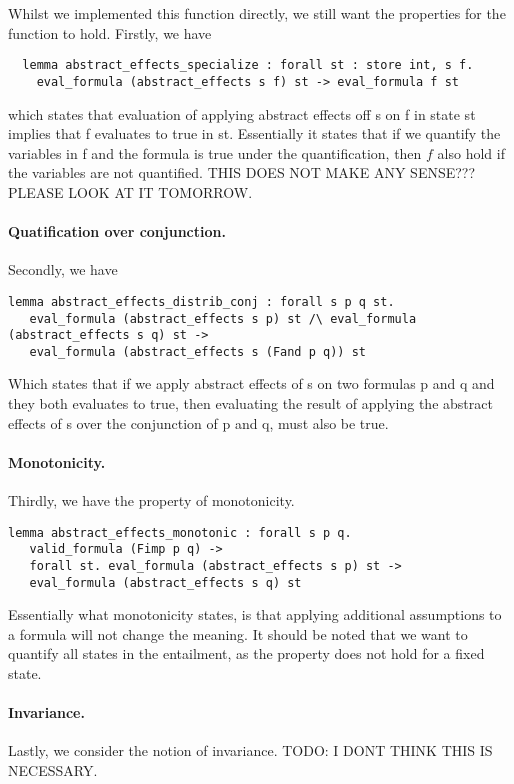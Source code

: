 Whilst we implemented this function directly, we still want the properties for the function to hold.
 Firstly, we have

\begin{lstlisting}
  lemma abstract_effects_specialize : forall st : store int, s f.
    eval_formula (abstract_effects s f) st -> eval_formula f st
\end{lstlisting}

which states that evaluation of applying abstract effects off s on f in state st implies that f evaluates to true in st. Essentially it states that if we quantify the variables in f and the formula is true under the quantification, then $f$ also hold if the variables are not quantified.
THIS DOES NOT MAKE ANY SENSE??? PLEASE LOOK AT IT TOMORROW.

\paragraph{Quatification over conjunction.}
Secondly, we have
\begin{lstlisting}
lemma abstract_effects_distrib_conj : forall s p q st.
   eval_formula (abstract_effects s p) st /\ eval_formula (abstract_effects s q) st ->
   eval_formula (abstract_effects s (Fand p q)) st
 \end{lstlisting}

Which states that if we apply abstract effects of s on two formulas p and q and they both evaluates to true,
then evaluating the result of applying the abstract effects of s over the conjunction of p and q, must also be true.

\paragraph{Monotonicity.}
Thirdly, we have the property of monotonicity.

\begin{lstlisting}
lemma abstract_effects_monotonic : forall s p q.
   valid_formula (Fimp p q) ->
   forall st. eval_formula (abstract_effects s p) st ->
   eval_formula (abstract_effects s q) st
 \end{lstlisting}

Essentially what monotonicity states, is that applying additional assumptions to a formula will not change the meaning. It should be noted that we want to quantify all states in the entailment, as the property does not hold for a fixed state.

\paragraph{Invariance.}
Lastly, we consider the notion of invariance.
TODO: I DONT THINK THIS IS NECESSARY.

